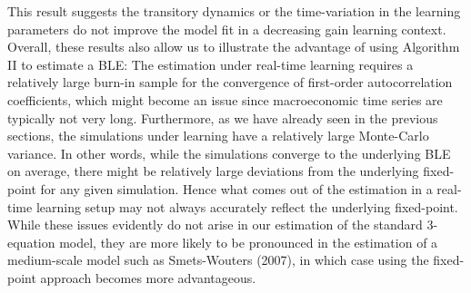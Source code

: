This result suggests the transitory dynamics or the time-variation in the learning parameters do not improve the model fit in a decreasing gain learning context. Overall, these results also allow us to illustrate the advantage of using Algorithm II to estimate a BLE: The estimation under real-time learning requires a relatively large burn-in sample for the convergence of first-order autocorrelation coefficients, which might become an issue since macroeconomic time series are typically not very long. Furthermore, as we have already seen in the previous sections, the simulations under learning have a relatively large Monte-Carlo variance. In other words, while the simulations converge to the underlying BLE on average, there might be relatively large deviations from the underlying fixed-point for any given simulation. Hence what comes out of the estimation in a real-time learning setup may not always accurately reflect the underlying fixed-point. While these issues evidently do not arise in our estimation of the standard 3-equation model, they are more likely to be pronounced in the estimation of a medium-scale model such as Smets-Wouters (2007), in which case using the fixed-point approach becomes more advantageous. \\